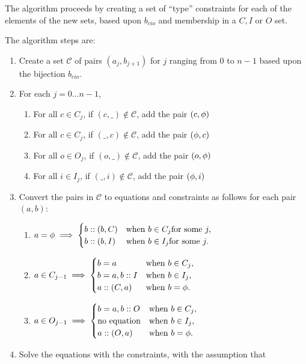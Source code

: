 The algorithm proceeds by creating a set of ``type'' constraints for each of the elements of the
new sets, based upon $b_{cio}$ and membership in a $C,I$ or $O$ set.

The algorithm steps are:
\begin{enumerate}
  \item Create a set $\mathcal{C}$ of pairs $(a_j,b_{j+1})$ for $j$
  ranging from $0$ to $n-1$ based upon the bijection $b_{cio}$.
  \item For each $j=0\ldots n-1$,
  \begin{enumerate}
    \item For all $c\in C_j$, if $(c,\_)\notin\mathcal{C}$,
      add the pair $(c,\phi)$
    \item For all $c\in C_j$, if $(\_,c)\notin\mathcal{C}$,
      add the pair $(\phi,c)$
    \item For all $o\in O_j$, if $(o,\_)\notin\mathcal{C}$,
      add the pair $(o,\phi)$
    \item For all $i\in I_j$, if $(\_,i)\notin\mathcal{C}$,
      add the pair $(\phi,i)$
  \end{enumerate}
  \item Convert the pairs in $\mathcal{C}$ to equations and constraints as
    follows for each pair $(a,b)$:
  \begin{enumerate}
    \item $a=\phi\implies \begin{cases}
      b::(b,C)&\text{when }b\in C_j\text{for some }j,\\
      b::(b,I)&\text{when }b\in I_j\text{for some }j.
    \end{cases}$
    \item $a\in C_{j-1}\implies \begin{cases}
      b=a&\text{when }b\in C_j,\\
      b=a, b::I&\text{when }b\in I_j,\\
      a::(C,a)&\text{when }b=\phi.
    \end{cases}$
    \item $a\in O_{j-1}\implies \begin{cases}
      b=a, b::O&\text{when }b\in C_j,\\
      \text{no equation}&\text{when }b\in I_j,\\
      a::(O,a)&\text{when }b=\phi.
    \end{cases}$
  \end{enumerate}
  \item Solve the equations with the constraints, with the assumption that

\end{enumerate}
